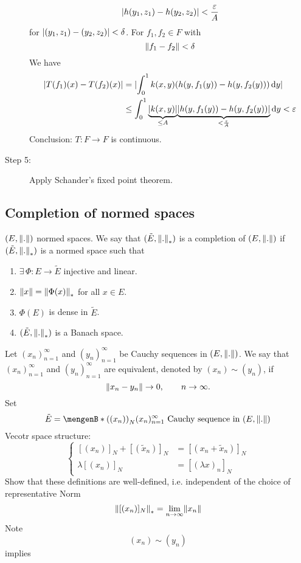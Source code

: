 \begin{beispiel}
\begin{description}
	\[
		\lvert h(y_1,z_1)-h(y_2,z_2)\rvert < \frac{\varepsilon}{A}
	\] 
	for $\lvert(y_1,z_1)-(y_2,z_2)\rvert < \delta $. For $f_1,f_2 \in F$ with
	\[
		\norm{f_1-f_2} < \delta 
	\]
	We have 
	\begin{align*}
		\lvert T(f_1)(x)-T(f_2)(x)\rvert &= \lvert\int_{0}^{1}k(x,y)(h(y,f_1(y))-h(y,f_2(y))) \,\mathrm{d}y\rvert \\
		&\leq  \int_{0}^{1}\underset{\leq A}{\underbrace{\lvert k(x,y)\rvert}}\underset{< \frac{\varepsilon}{A}}{\underbrace{\lvert h(y,f_1(y))-h(y,f_2(y))\rvert}} \,\mathrm{d}y < \varepsilon 
	\end{align*}
	Conclusion: $T: F \to F$ is continuous. 
	\item[Step 5:] Apply Schander's fixed point theorem.
	\end{description}
\end{beispiel}
\subsection{Completion of normed spaces} 
\label{sub:completion_of_normed_spaces}
$(E,\norm{.})$ normed spaces. We say that $(\tilde E, \norm{.}_*)$ is a completion of $(E,\norm{.})$ if $(\tilde E, \norm{.}_*)$ is a normed space such that
\begin{enumerate}[(1)]
	\item $\exists\, \Phi: E \to \tilde E$ injective and linear.
	\item $\norm{x} = \norm{\Phi(x)}_*$ for all $x \in E$.
	\item $\Phi(E)$ is dense in $\tilde E$.
	\item $(\tilde E, \norm{.}_*)$ is a Banach space.
\end{enumerate}
Let $(x_n)_{n=1}^{\infty}$ and $(y_n)_{n=1}^{\infty}$ be Cauchy sequences in $(E,\norm{.})$. We say that $(x_n)_{n=1}^{\infty}$ and $(y_n)_{n=1}^{\infty}$ are equivalent, denoted by $(x_n) \sim (y_n)$, if 
\[
	\norm{x_n-y_n} \to 0, \qquad n \to \infty.
\]
Set \[
	\tilde E= \set[ \left((x_n) \right)_N]{(x_n)_{n=1}^{\infty} \text{ Cauchy sequence in } (E,\norm{.})}
\]
Vecotr space structure:
\[
	\begin{cases}
		[(x_n)]_N + [(\tilde x_n)]_N &= [(x_n + \tilde x_n)]_N \\
		\lambda [(x_n)]_N &= [(\lambda x)_n]_N
	\end{cases}
\]
Show that these definitions are well-defined, i.e. independent of the choice of representative Norm
\[
	\norm{ [(x_n)]_N}_* = \lim_{n \to \infty} \norm{x_n}
\]
Note \[
	(x_n) \sim (y_n)
\]
implies
